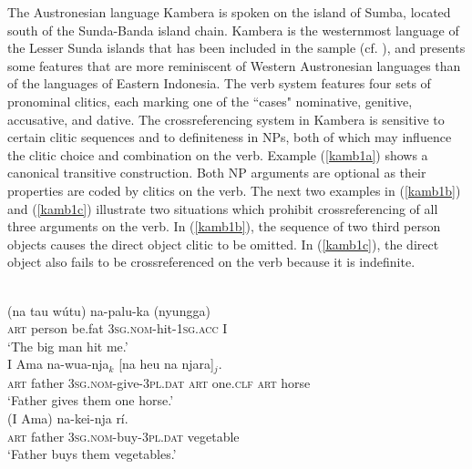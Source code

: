 The Austronesian language Kambera is spoken on the island of Sumba, located south of the Sunda-Banda island chain. Kambera is the westernmost language of the Lesser Sunda islands that has been included in the sample (cf. ), and presents some features that are more reminiscent of Western Austronesian languages than of the languages of Eastern Indonesia. The verb system features four sets of pronominal clitics, each marking one of the ``cases" nominative, genitive, accusative, and dative. The crossreferencing system in Kambera is sensitive to certain clitic sequences and to definiteness in NPs, both of which may influence the clitic choice and combination on the verb. Example (\ref{kamb1a}) shows a canonical transitive construction. Both NP arguments are optional as their properties are coded by clitics on the verb. The next two examples in (\ref{kamb1b}) and (\ref{kamb1c}) illustrate two situations which prohibit crossreferencing of all three arguments on the verb. In (\ref{kamb1b}), the sequence of two third person objects causes the direct object clitic to be omitted. In (\ref{kamb1c}), the direct object also fails to be crossreferenced on the verb because it is indefinite.

\ea 
{}\\
\ea \label{kamb1a}
\gll (na tau wútu) na-palu-ka (nyungga) \\
\textsc{art} person be.fat \textsc{3}\textsc{sg}.\textsc{nom}-hit-\textsc{1}\textsc{sg}.\textsc{acc} I \\
\glft `The big man hit me.' \\ 
\ex \label{kamb1b}
\gll I Ama na-wua-nja$_k$ [na heu na njara]$_j$. \\
\textsc{art} father \textsc{3}\textsc{sg}.\textsc{nom}-give-\textsc{3}\textsc{pl}.\textsc{dat} \textsc{art} one.\textsc{clf} \textsc{art} horse \\
\glft `Father gives them one horse.' \\ 
\ex \label{kamb1c}
\gll (I Ama) na-kei-nja rí. \\ 
\textsc{art} father \textsc{3}\textsc{sg}.\textsc{nom}-buy-\textsc{3}\textsc{pl}.\textsc{dat} vegetable \\
\glft `Father buys them vegetables.'\\ 
\z
\z

